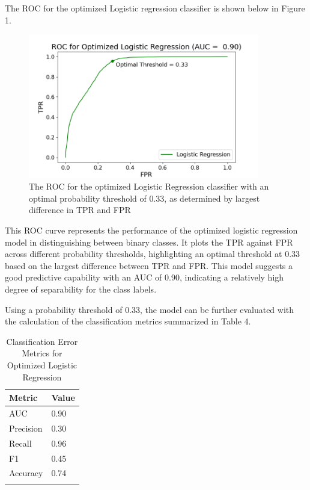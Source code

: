 \documentclass[11pt]{article}
\begin{document}
The ROC for the optimized Logistic regression classifier is shown below in Figure 1.
\begin{figure}[H]
\centering
\includegraphics[width = 0.9\textwidth]{lr_roc.png} 
\caption{ The ROC for the optimized Logistic Regression classifier with an optimal probability threshold of 0.33, as determined by largest difference in TPR and FPR}
\label{ROC}
\end{figure}

This ROC curve represents the performance of the optimized logistic regression model in distinguishing between binary classes.  It plots the TPR against FPR across different probability thresholds, highlighting an optimal threshold at 0.33 based on the largest difference between TPR and FPR. This model suggests a good predictive capability with an AUC of 0.90, indicating a relatively high degree of separability for the class labels. 
 
Using a probability threshold of 0.33, the model can be further evaluated with the calculation of the classification metrics summarized in Table 4.  
   
\begin{table}[hbt!]
\centering
\caption{Classification Error Metrics for Optimized Logistic Regression}
\begin{tabular}{ll}
\hline
\textbf{Metric }& \textbf{Value }\\
\hline
AUC &0.90  \\
Precision &0.30   \\
Recall &0.96  \\
F1 &0.45 \\
Accuracy &0.74 \\
\label{tB}
\end{tabular}
\end{table}
\end{document}

